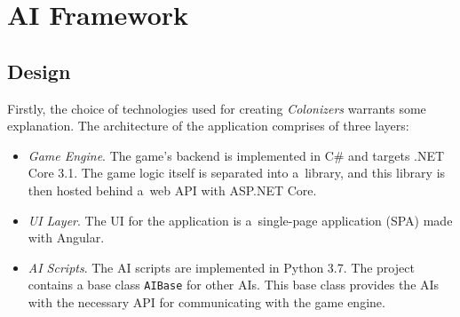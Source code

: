 \chapter{AI Framework}

\section{Design}

Firstly, the choice of technologies used for creating \emph{Colonizers}
warrants some explanation. The architecture of the application comprises of three layers:
\begin{itemize}
    \item \emph{Game Engine}. The game's backend is implemented in C\# and targets
        .NET Core 3.1. The game logic itself is separated into a~library,
        and this library is then hosted behind a~web API with ASP.NET Core.
    \item \emph{UI Layer}. The UI for the application is a~single-page application
        (SPA) made with Angular.
    \item \emph{AI Scripts}. The AI scripts are implemented in Python 3.7. The project
        contains a base class \texttt{AIBase} for other AIs. This base class provides
        the AIs with the necessary API for communicating with the game engine.
\end{itemize}

